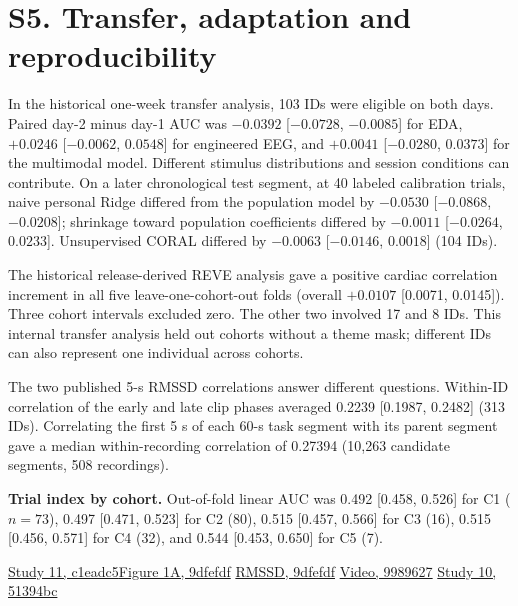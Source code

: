 \documentclass[10pt]{article}
\begin{document}
\section*{S5. Transfer, adaptation and reproducibility}
In the historical one-week transfer analysis, 103 IDs were eligible on both days. Paired day-2 minus day-1 AUC was $-0.0392$ [$-0.0728$, $-0.0085$] for EDA, $+0.0246$ [$-0.0062$, $0.0548$] for engineered EEG, and $+0.0041$ [$-0.0280$, $0.0373$] for the multimodal model. Different stimulus distributions and session conditions can contribute. On a later chronological test segment, at 40 labeled calibration trials, naive personal Ridge differed from the population model by $-0.0530$ [$-0.0868$, $-0.0208$]; shrinkage toward population coefficients differed by $-0.0011$ [$-0.0264$, $0.0233$]. Unsupervised CORAL differed by $-0.0063$ [$-0.0146$, $0.0018$] (104 IDs).

The historical release-derived REVE analysis gave a positive cardiac correlation increment in all five leave-one-cohort-out folds (overall $+0.0107$ [0.0071, 0.0145]). Three cohort intervals excluded zero. The other two involved 17 and 8 IDs. This internal transfer analysis held out cohorts without a theme mask; different IDs can also represent one individual across cohorts.

The two published 5-s RMSSD correlations answer different questions. Within-ID correlation of the early and late clip phases averaged 0.2239 [0.1987, 0.2482] (313 IDs). Correlating the first 5 s of each 60-s task segment with its parent segment gave a median within-recording correlation of 0.27394 (10,263 candidate segments, 508 recordings).

\textbf{Trial index by cohort.} Out-of-fold linear AUC was 0.492 [0.458, 0.526] for C1 ($n=73$), 0.497 [0.471, 0.523] for C2 (80), 0.515 [0.457, 0.566] for C3 (16), 0.515 [0.456, 0.571] for C4 (32), and 0.544 [0.453, 0.650] for C5 (7).

\smallskip
\small\href{https://github.com/mathiaschebbah/habs/actions/runs/45854683170}{Study 11, c1eadc5}\quad\href{https://github.com/mathiaschebbah/habs/actions/runs/44635398113/attempts/2}{Figure 1A, 9dfefdf}
\quad\href{https://github.com/mathiaschebbah/habs/actions/runs/44635461916/attempts/2}{RMSSD, 9dfefdf}
\quad\href{https://github.com/mathiaschebbah/habs/actions/runs/45091493959}{Video, 9989627}
\quad\href{https://github.com/mathiaschebbah/habs/actions/runs/45604993423}{Study 10, 51394bc}
\end{document}

